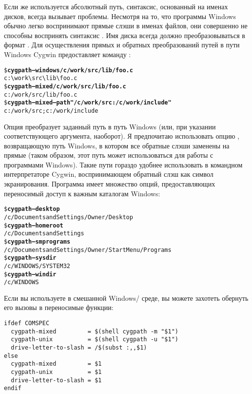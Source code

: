 Если же используется абсолютный путь, синтаксис, основанный на именах
дисков, всегда вызывает проблемы. Несмотря на то, что программы
Windows обычно легко воспринимают прямые слэши в именах файлов, они
совершенно не способны воспринять синтаксис . Имя диска
всегда должно преобразовываться в формат . Для
осуществления прямых и обратных преобразований путей \POSIX{} в пути
Windows Cygwin предоставляет команду :

\begin{alltt}
\footnotesize
\$ \textbf{cygpath --windows /c/work/src/lib/foo.c}
c:\textbackslash{}work\textbackslash{}src\textbackslash{}lib\textbackslash{}foo.c
\$ \textbf{cygpath --mixed /c/work/src/lib/foo.c}
c:/work/src/lib/foo.c
\$ \textbf{cygpath --mixed --path "/c/work/src:/c/work/include"}
c:/work/src;c:/work/include
\end{alltt}

Опция  преобразует заданный путь \POSIX{} в путь
Windows (или, при указании соответствующего аргумента, наоборот). Я
предпочитаю использовать опцию , возвращающую путь
Windows, в котором все обратные слэши заменены на прямые (таком
образом, этот путь может использоваться для работы с программами
Windows). Такие пути гораздо удобнее использовать в командном
интерпретаторе Cygwin, воспринимающем обратный слэш как символ
экранирования. Программа  имеет множество опций,
предоставляющих переносимый доступ к важным каталогам Windows:

\begin{alltt}
\footnotesize
\$ \textbf{cygpath --desktop}
/c/Documents and Settings/Owner/Desktop
\$ \textbf{cygpath --homeroot}
/c/Documents and Settings
\$ \textbf{cygpath --smprograms}
/c/Documents and Settings/Owner/Start Menu/Programs
\$ \textbf{cygpath --sysdir}
/c/WINDOWS/SYSTEM32
\$ \textbf{cygpath --windir}
/c/WINDOWS
\end{alltt}

Если вы используете  в смешанной Windows/\UNIX{}
среде, вы можете захотеть обернуть его вызовы в переносимые функции:

{\footnotesize
\begin{verbatim}
ifdef COMSPEC
  cygpath-mixed         = $(shell cygpath -m "$1")
  cygpath-unix          = $(shell cygpath -u "$1")
  drive-letter-to-slash = /$(subst :,,$1)
else
  cygpath-mixed         = $1
  cygpath-unix          = $1
  drive-letter-to-slash = $1
endif
\end{verbatim}
}

